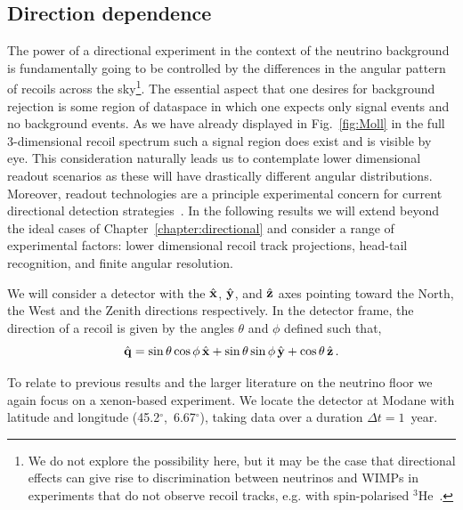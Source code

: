 \subsection{Direction dependence}\label{sec:nufloor_res} 
The power of a directional experiment in the context of the neutrino background is fundamentally going to be controlled by the differences in the angular pattern of recoils across the sky\footnote{We do not explore the possibility here, but it may be the case that directional effects can give rise to discrimination between neutrinos and WIMPs in experiments that do not observe recoil tracks, e.g. with spin-polarised $^3$He~\cite{Franarin:2016ppr}.}. The essential aspect that one desires for background rejection is some region of dataspace in which one expects only signal events and no background events. As we have already displayed in Fig.~\ref{fig:Moll} in the full 3-dimensional recoil spectrum such a signal region does exist and is visible by eye. This consideration naturally leads us to contemplate lower dimensional readout scenarios as these will have drastically different angular distributions. Moreover, readout technologies are a principle experimental concern for current directional detection strategies~\cite{Battat:2016pap}. In the following results we will extend beyond the ideal cases of Chapter~\ref{chapter:directional} and consider a range of experimental factors: lower dimensional recoil track projections, head-tail recognition, and finite angular resolution.

We will consider a detector with the $\hat{{\bf x}}$,  $\hat{{\bf y}}$, and $\hat{{\bf z}}$ axes pointing toward the North, the West and the Zenith directions respectively. In the detector frame, the direction of a recoil is given by the angles $\theta$ and $\phi$ defined such that,
\begin{equation}
\hat{{\bf q}} = \sin\theta\cos\phi \, \hat{{\bf x}} + \sin\theta\sin\phi \, \hat{{\bf y}} + \cos\theta \, \hat{{\bf z}} \,.
\label{eq:angles}
\end{equation}

To relate to previous results and the larger literature on the neutrino floor we again focus on a xenon-based experiment. We locate the detector at Modane with latitude and longitude (45.2$^\circ$,~6.67$^\circ$), taking data over a duration $\Delta t = 1$~year. 

